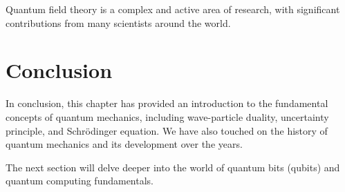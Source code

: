 Quantum field theory is a complex and active area of research, with significant contributions from many scientists around the world.

\section*{Conclusion}

In conclusion, this chapter has provided an introduction to the fundamental concepts of quantum mechanics, including wave-particle duality, uncertainty principle, and Schrödinger equation. We have also touched on the history of quantum mechanics and its development over the years.

The next section will delve deeper into the world of quantum bits (qubits) and quantum computing fundamentals.